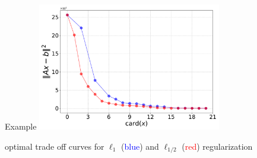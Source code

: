 \documentclass[aspectratio=169,11pt]{beamer}
\begin{document}
\begin{frame}{Example}
\centering
\includegraphics[width=0.60\textwidth]{pareto_curve_version2.pdf}
\vfill\centering

optimal trade off curves for $\ell_1$ (\textcolor{blue}{blue}) and 
$\ell_{1/2}$ (\textcolor{red}{red}) regularization
\end{frame}

%

\end{document}
